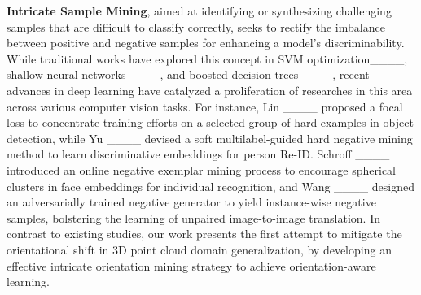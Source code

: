 \noindent\textbf{Intricate Sample Mining}, aimed at identifying or synthesizing challenging samples that are difficult to classify correctly, seeks to rectify the imbalance between positive and negative samples for enhancing a model's discriminability. While traditional works have explored this concept in SVM optimization____, shallow neural networks____, and boosted decision trees____, recent advances in deep learning have catalyzed a proliferation of researches in this area across various computer vision tasks. For instance, 
Lin \etal____ proposed a focal loss to concentrate training efforts on a selected group of hard examples in object detection, while Yu \etal____ devised a soft multilabel-guided hard negative mining method to learn discriminative embeddings for person Re-ID. Schroff \etal____ introduced an online negative exemplar mining process to encourage spherical clusters in face embeddings for individual recognition, and Wang \etal____ designed an adversarially trained negative generator to yield instance-wise negative samples, bolstering the learning of unpaired image-to-image translation. In contrast to existing studies, our work presents the first attempt to mitigate the orientational shift in 3D point cloud domain generalization, by developing an effective intricate orientation mining strategy to achieve orientation-aware learning.
